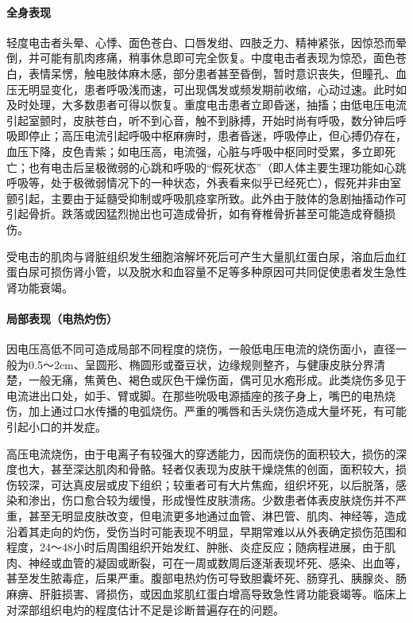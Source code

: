 \paragraph{全身表现}

轻度电击者头晕、心悸、面色苍白、口唇发绀、四肢乏力、精神紧张，因惊恐而晕倒，并可能有肌肉疼痛，稍事休息即可完全恢复。中度电击者表现为惊恐，面色苍白，表情呆愣，触电肢体麻木感，部分患者甚至昏倒，暂时意识丧失，但瞳孔、血压无明显变化，患者呼吸浅而速，可出现偶发或频发期前收缩，心动过速。此时如及时处理，大多数患者可得以恢复。重度电击患者立即昏迷，抽搐；由低电压电流引起室颤时，皮肤苍白，听不到心音，触不到脉搏，开始时尚有呼吸，数分钟后呼吸即停止；高压电流引起呼吸中枢麻痹时，患者昏迷，呼吸停止，但心搏仍存在，血压下降，皮色青紫；如电压高，电流强，心脏与呼吸中枢同时受累，多立即死亡；也有电击后呈极微弱的心跳和呼吸的“假死状态”（即人体主要生理功能如心跳呼吸等，处于极微弱情况下的一种状态，外表看来似乎已经死亡），假死并非由室颤引起，主要由于延髓受抑制或呼吸肌痉挛所致。此外由于肢体的急剧抽搐动作可引起骨折。跌落或因猛烈抛出也可造成骨折，如有脊椎骨折甚至可能造成脊髓损伤。

受电击的肌肉与肾脏组织发生细胞溶解坏死后可产生大量肌红蛋白尿，溶血后血红蛋白尿可损伤肾小管，以及脱水和血容量不足等多种原因可共同促使患者发生急性肾功能衰竭。

\paragraph{局部表现（电热灼伤）}

因电压高低不同可造成局部不同程度的烧伤，一般低电压电流的烧伤面小，直径一般为0.5～2cm、呈圆形、椭圆形或蚕豆状，边缘规则整齐，与健康皮肤分界清楚，一般无痛，焦黄色、褐色或灰色干燥伤面，偶可见水疱形成。此类烧伤多见于电流进出口处，如手、臂或脚。在那些吮吸电源插座的孩子身上，嘴巴的电热烧伤，加上通过口水传播的电弧烧伤。严重的嘴唇和舌头烧伤造成大量坏死，有可能引起小口的并发症。

高压电流烧伤，由于电离子有较强大的穿透能力，因而烧伤的面积较大，损伤的深度也大，甚至深达肌肉和骨骼。轻者仅表现为皮肤干燥烧焦的创面，面积较大，损伤较深，可达真皮层或皮下组织；较重者可有大片焦痂，组织坏死，以后脱落，感染和渗出，伤口愈合较为缓慢，形成慢性皮肤溃疡。少数患者体表皮肤烧伤并不严重，甚至无明显皮肤改变，但电流更多地通过血管、淋巴管、肌肉、神经等，造成沿着其走向的灼伤，受伤当时可能表现不明显，早期常难以从外表确定损伤范围和程度，24～48小时后周围组织开始发红、肿胀、炎症反应；随病程进展，由于肌肉、神经或血管的凝固或断裂，可在一周或数周后逐渐表现坏死、感染、出血等，甚至发生脓毒症，后果严重。腹部电热灼伤可导致胆囊坏死、肠穿孔、胰腺炎、肠麻痹、肝脏损害、肾损伤，或因血浆肌红蛋白增高导致急性肾功能衰竭等。临床上对深部组织电灼的程度估计不足是诊断普遍存在的问题。

